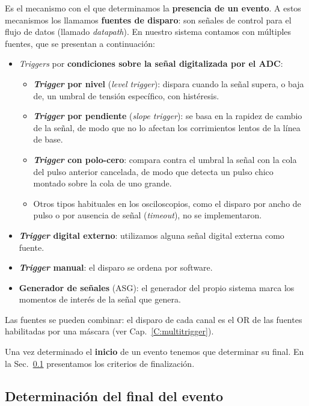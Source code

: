 Es el mecanismo con el que determinamos la \textbf{presencia de un evento}. A
estos mecanismos los llamamos \textbf{fuentes de disparo}: son señales de control
para el flujo de datos (llamado \emph{datapath}). En nuestro sistema contamos
con múltiples fuentes, que se presentan a continuación:
\begin{itemize}
  \item \emph{Triggers} por \textbf{condiciones sobre la señal digitalizada por el
    ADC}:
  \begin{itemize}
    \item \textbf{\emph{Trigger} por nivel} (\emph{level trigger}): dispara cuando la
      señal supera, o baja de, un umbral de tensión específico, con histéresis.
    \item \textbf{\emph{Trigger} por pendiente} (\emph{slope trigger}): se basa en la
      rapidez de cambio de la señal, de modo que no lo afectan los corrimientos
      lentos de la línea de base.
    \item \textbf{\emph{Trigger} con polo-cero}: compara contra el umbral la señal con
      la cola del pulso anterior cancelada, de modo que detecta un pulso chico
      montado sobre la cola de uno grande.
    \item Otros tipos habituales en los osciloscopios, como el disparo por ancho
      de pulso o por ausencia de señal (\emph{timeout}), no se implementaron.
  \end{itemize}
  \item \textbf{\emph{Trigger} digital externo}: utilizamos alguna señal digital
    externa como fuente.
  \item \textbf{\emph{Trigger} manual}: el disparo se ordena por software.
  \item \textbf{Generador de señales} (ASG): el generador del propio sistema
    marca los momentos de interés de la señal que genera.
\end{itemize}

Las fuentes se pueden combinar: el disparo de cada canal es el OR de las fuentes
habilitadas por una máscara (ver Cap.~\ref{C:multitrigger}).

Una vez determinado el \textbf{inicio} de un evento tenemos que determinar su
final. En la Sec.~\ref{S:mca-final-evento} presentamos los criterios de finalización.

\subsection{Determinación del final del evento}
\label{S:mca-final-evento}

